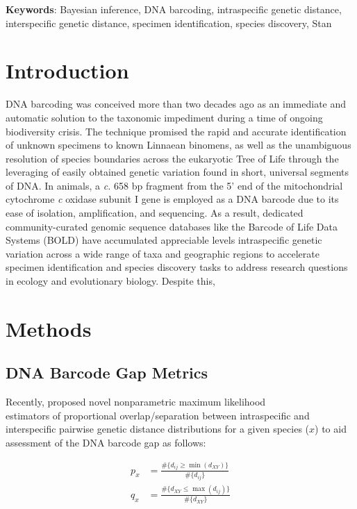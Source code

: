 \documentclass[12pt]{article}
\begin{document}
\textbf{Keywords}: Bayesian inference, DNA barcoding, intraspecific genetic distance, \\ interspecific genetic distance, specimen identification, species discovery, Stan 

\vspace{2mm}

\section{Introduction}

DNA barcoding \citep{hebert2003biological, hebert2003barcoding} was conceived more than two decades ago as an immediate and automatic solution to the taxonomic impediment during a time of ongoing biodiversity crisis. The technique promised the rapid and accurate identification of unknown specimens to known Linnaean binomens, as well as the unambiguous resolution of species boundaries across the eukaryotic Tree of Life through the leveraging of easily obtained genetic variation found in short, universal segments of DNA. In animals, a \textit{c.} 658 bp fragment from the 5' end of the mitochondrial cytochrome \textit{c} oxidase subunit I gene is employed as a DNA barcode due to its ease of isolation, amplification, and sequencing. As a result, dedicated community-curated genomic sequence databases like the Barcode of Life Data Systems (BOLD) \citep{ratnasingham2007bold} have accumulated appreciable levels intraspecific genetic variation across a wide range of taxa and geographic regions to accelerate specimen identification and species discovery tasks to address research questions in ecology and evolutionary biology. Despite this, 


\section{Methods}

\subsection{DNA Barcode Gap Metrics}

Recently, \citet{phillips2024measure} proposed novel nonparametric maximum likelihood \\ estimators of proportional overlap/separation between intraspecific and interspecific pairwise genetic distance distributions for a given species ($x$) to aid assessment of the DNA barcode gap as follows:

\begin{align}
p_x &= \frac{\#\{d_{ij} \geq \min(d_{XY})\}}{\#\{d_{ij}\}} \\
q_x &= \frac{\#\{d_{XY} \leq \max(d_{ij})\}}{\#\{d_{XY}\}}
\end{align}
\end{document}
